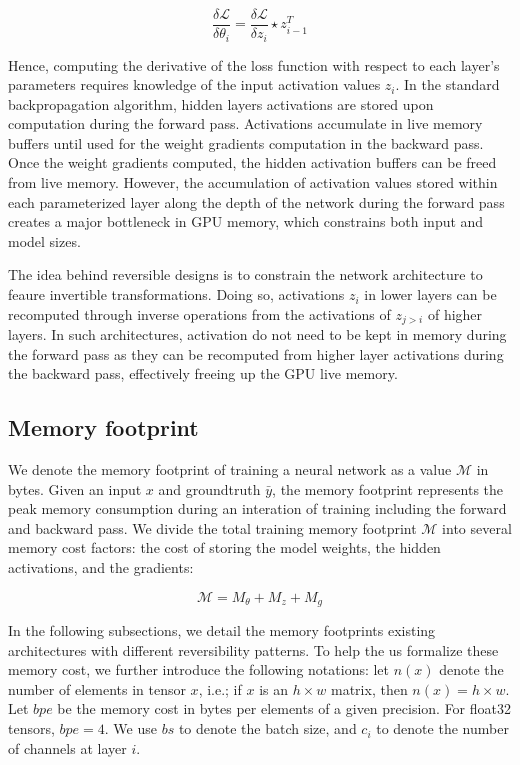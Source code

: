 \documentclass[twocolumn]{bmcart}
\begin{document}
 \begin{equation}
\frac{\delta \mathcal{L}}{\delta \theta_i} = \frac{\delta \mathcal{L}}{\delta z_i} \star z_{i-1}^T
 \end{equation}

Hence, computing the derivative of the loss function with respect to each layer's parameters requires knowledge of the input activation values $z_i$.  In the standard backpropagation algorithm, hidden layers activations are stored upon computation during the forward pass. Activations accumulate in live memory buffers until used for the weight gradients computation in the backward pass. Once the weight gradients computed, the hidden activation buffers can be freed from live memory. 
However, the accumulation of activation values stored within each parameterized layer along the depth of the network during the forward pass creates a major bottleneck in GPU memory, which constrains both input and model sizes.

The idea behind reversible designs is to constrain the network architecture to feaure invertible transformations. 
Doing so, activations $z_i$ in lower layers can be recomputed through inverse operations from the activations of $z_{j>i}$ of higher layers. 
In such architectures, activation do not need to be kept in memory during the forward pass as they can be recomputed from higher layer activations during the backward pass, effectively freeing up the GPU live memory.

\subsection{Memory footprint}

We denote the memory footprint of training a neural network as a value $\mathcal{M}$ in bytes. Given an input $x$ and groundtruth $\bar{y}$, the memory footprint represents the peak memory consumption during an interation of training including the forward and backward pass. 
We divide the total training memory footprint $\mathcal{M}$ into several memory cost factors: the cost of storing the model weights, the hidden activations, and the gradients:

\begin{equation}
\mathcal{M} = M_{\theta} + M_{z} + M_{g}
\end{equation}

In the following subsections, we detail the memory footprints existing architectures with different reversibility patterns. 
To help the us formalize these memory cost, we further introduce the following notations: let $n(x)$ denote the number of elements in tensor $x$, i.e.; if $x$ is an $h \times w$ matrix, then $n(x)=h \times w$. 
Let $bpe$ be the memory cost in bytes per elements of a given precision. 
For float32 tensors, $bpe=4$. We use $bs$ to denote the batch size, and $c_i$ to denote the number of channels at layer $i$.
\end{document}

